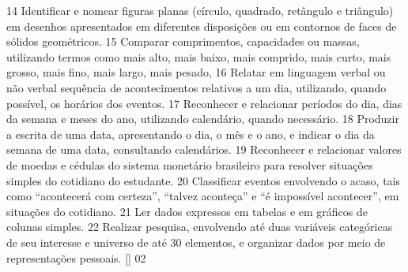 {{		{14}{%
			Identificar e nomear figuras planas (círculo, quadrado, retângulo e triângulo) em desenhos apresentados em diferentes disposições ou em contornos de faces de sólidos geométricos.
		}
		{15}{%
			Comparar comprimentos, capacidades ou massas, utilizando termos como mais alto, mais baixo, mais comprido, mais curto, mais grosso, mais fino, mais largo, mais pesado,
		}
		{16}{%
			Relatar em linguagem verbal ou não verbal sequência de acontecimentos relativos a um dia, utilizando, quando possível, os horários dos eventos.
		}
		{17}{%
			Reconhecer e relacionar períodos do dia, dias da semana e meses do ano, utilizando calendário, quando necessário.
		}
		{18}{%
			Produzir a escrita de uma data, apresentando o dia, o mês e o ano, e indicar o dia da semana de uma data, consultando calendários.
		}
		{19}{%
			Reconhecer e relacionar valores de moedas e cédulas do sistema monetário brasileiro para resolver situações simples do cotidiano do estudante.
		}
		{20}{%
			Classificar eventos envolvendo o acaso, tais como “acontecerá com certeza”, “talvez aconteça” e “é impossível acontecer”, em situações do cotidiano.
		}
		{21}{%
			Ler dados expressos em tabelas e em gráficos de colunas simples.
		}
		{22}{%
			Realizar pesquisa, envolvendo até duas variáveis categóricas de seu interesse e universo de até 30 elementos, e organizar dados por meio de representações pessoais.
		}[\la@invalidefhability]
	}
	{02}{%
		}}
